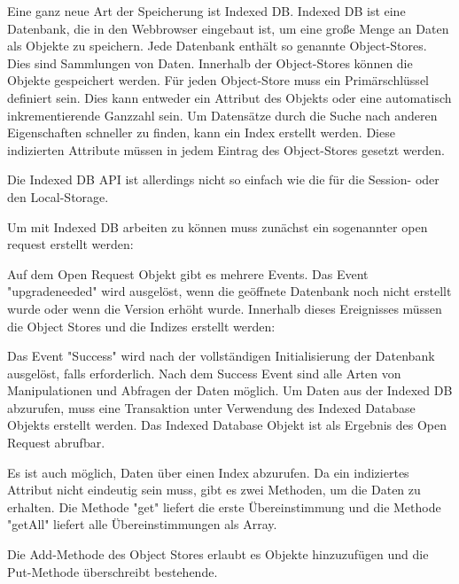 
Eine ganz neue Art der Speicherung ist Indexed DB. Indexed DB ist eine Datenbank, die in den Webbrowser eingebaut ist, um eine große Menge an Daten als Objekte zu speichern. Jede Datenbank enthält so genannte Object-Stores. Dies sind Sammlungen von Daten. Innerhalb der Object-Stores können die Objekte gespeichert werden. Für jeden Object-Store muss ein Primärschlüssel definiert sein. Dies kann entweder ein Attribut des Objekts oder eine automatisch inkrementierende Ganzzahl sein. Um Datensätze durch die Suche nach anderen Eigenschaften schneller zu finden, kann ein Index erstellt werden. Diese indizierten Attribute müssen in jedem Eintrag des Object-Stores gesetzt werden.

Die Indexed DB API ist allerdings nicht so einfach wie die für die Session- oder den Local-Storage. 

Um mit Indexed DB arbeiten zu können muss zunächst ein sogenannter open request erstellt werden:


Auf dem Open Request Objekt gibt es mehrere Events. Das Event "upgradeneeded" wird ausgelöst, wenn die geöffnete Datenbank noch nicht erstellt wurde oder wenn die Version erhöht wurde. Innerhalb dieses Ereignisses müssen die Object Stores und die Indizes erstellt werden: 


Das Event "Success" wird nach der vollständigen Initialisierung der Datenbank ausgelöst, falls erforderlich. Nach dem Success Event sind alle Arten von Manipulationen und Abfragen der Daten möglich. Um Daten aus der Indexed DB abzurufen, muss eine Transaktion unter Verwendung des Indexed Database Objekts erstellt werden. Das Indexed Database Objekt ist als Ergebnis des Open Request abrufbar.


Es ist auch möglich, Daten über einen Index abzurufen. Da ein indiziertes 
Attribut nicht eindeutig sein muss, gibt es zwei Methoden, um die Daten zu erhalten. Die Methode "get" liefert die erste Übereinstimmung und die Methode "getAll" liefert alle Übereinstimmungen als Array.


Die Add-Methode des Object Stores erlaubt es Objekte hinzuzufügen und die Put-Methode überschreibt bestehende.
\cite{MDNIndexedDB}
\cite{MDNUsingIndexedDB}